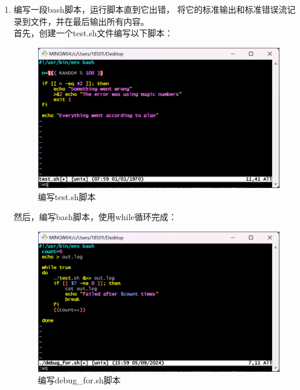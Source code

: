 \documentclass{ctexart}
\begin{document}
\begin{enumerate}
    \item  编写一段bash脚本，运行脚本直到它出错，
    将它的标准输出和标准错误流记录到文件，并在最后输出所有内容。\\
    首先，创建一个test.sh文件编写以下脚本：\\
    \begin{figure}[H]
       \centering
       \includegraphics[width=14cm]{5fef4a7247b016a0fcaa02091262145c.png}
       \caption{编写test.sh脚本}
       \label{fig:3}
   \end{figure}
   然后，编写bash脚本，使用while循环完成：\\
   \begin{figure}[H]
    \centering
    \includegraphics[width=14cm]{8948ac2ccd139bf852cab4120aa894c4.png}
    \caption{编写debug\_for.sh脚本}
    \label{fig:3}
    \end{figure}


\end{enumerate}
\end{document}
